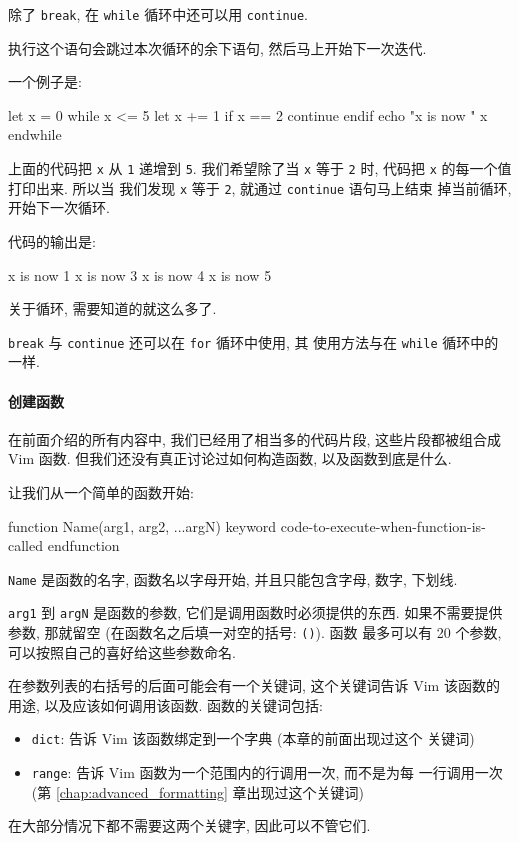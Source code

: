 除了 \texttt{break}, 在 \texttt{while} 循环中还可以用 \texttt{continue}.

执行这个语句会跳过本次循环的余下语句, 然后马上开始下一次迭代.

一个例子是:
\begin{vimcode}
let x = 0
while x <= 5
    let x += 1
    if x ==  2
        continue
    endif
    echo "x is now " x
endwhile
\end{vimcode}
上面的代码把 \texttt{x} 从 \texttt{1} 递增到 \texttt{5}. 我们希望除了当
\texttt{x} 等于 \texttt{2} 时, 代码把 \texttt{x} 的每一个值打印出来. 所以当
我们发现 \texttt{x} 等于 \texttt{2}, 就通过 \texttt{continue} 语句马上结束
掉当前循环, 开始下一次循环.

代码的输出是:
\begin{vimcode}
x is now 1
x is now 3
x is now 4
x is now 5
\end{vimcode}
关于循环, 需要知道的就这么多了.

\begin{warning}
    \texttt{break} 与 \texttt{continue} 还可以在 \texttt{for} 循环中使用, 其
    使用方法与在 \texttt{while} 循环中的一样.
\end{warning}

\paragraph{创建函数}
\label{para:creating_functions}

在前面介绍的所有内容中, 我们已经用了相当多的代码片段, 这些片段都被组合成 Vim
函数. 但我们还没有真正讨论过如何构造函数, 以及函数到底是什么.

让我们从一个简单的函数开始:
\begin{vimcode}
function Name(arg1, arg2, ...argN) keyword
    code-to-execute-when-function-is-called
endfunction
\end{vimcode}
\texttt{Name} 是函数的名字, 函数名以字母开始, 并且只能包含字母, 数字, 下划线.

\texttt{arg1} 到 \texttt{argN} 是函数的参数, 它们是调用函数时必须提供的东西.
如果不需要提供参数, 那就留空 (在函数名之后填一对空的括号: \texttt{()}). 函数
最多可以有 20 个参数, 可以按照自己的喜好给这些参数命名.

在参数列表的右括号的后面可能会有一个关键词, 这个关键词告诉 Vim 该函数的用途,
以及应该如何调用该函数. 函数的关键词包括:
\begin{itemize}
    \item \texttt{dict}: 告诉 Vim 该函数绑定到一个字典 (本章的前面出现过这个
        关键词)
    \item \texttt{range}: 告诉 Vim 函数为一个范围内的行调用一次, 而不是为每
        一行调用一次 (第 \ref{chap:advanced_formatting} 章出现过这个关键词)
\end{itemize}
在大部分情况下都不需要这两个关键字, 因此可以不管它们.

